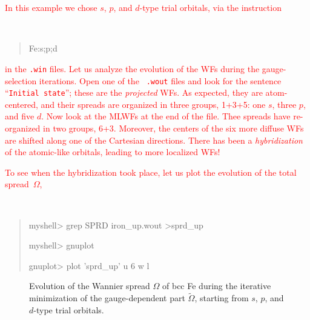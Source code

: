 \documentclass[a4paper,11pt,twoside]{article}
\def\tent#1{\textcolor{red}{#1}}     %
\begin{document}
\tent{In this example we chose $s$, $p$, and $d$-type trial orbitals,
  via the instruction} {\tt
\begin{quote}
Fe:s;p;d

\end{quote}
} \tent{in the {\tt .win} files. Let us analyze the evolution of the
  WFs during the gauge-selection iterations. Open one of the {\tt
    .wout} files and look for the sentence ``{\tt Initial state}'';
  these are the {\it projected} WFs. As expected, they are
  atom-centered, and their spreads are organized in three groups,
  1+3+5: one $s$, three $p$, and five $d$.  Now look at the MLWFs at
  the end of the file.  Thee spreads have re-organized in two groups,
  6+3.  Moreover, the centers of the six more diffuse WFs are shifted
  along one of the Cartesian directions. There has been a {\it
    hybridization} of the atomic-like orbitals, leading to more
  localized WFs!}

\tent{To see when the hybridization took place, let us plot the
  evolution of the total spread~$\Omega$,} 
{\tt
\begin{quote}
myshell> grep SPRD iron\_up.wout >sprd\_up

myshell> gnuplot

gnuplot> plot 'sprd\_up' u 6  w l

\end{quote}
}

\begin{figure}[h]
\begin{center}
\caption{Evolution of the Wannier spread $\Omega$ of bcc Fe during the
  iterative minimization of the gauge-dependent part
  $\widetilde{\Omega}$, starting from $s$, $p$, and $d$-type trial
  orbitals.}
\label{fig:Fe-sprd}
\end{center}
\end{figure}
\end{document}
